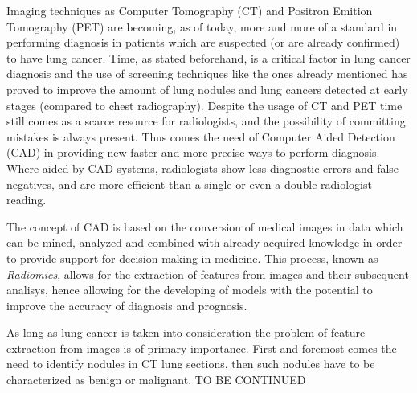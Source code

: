 \documentclass[../main.tex]{subfiles}
\begin{document}
\label{stateofart}
\thispagestyle{empty}

Imaging techniques as Computer Tomography (CT) and Positron Emition Tomography (PET) are becoming, as of today, more and more of a standard in performing diagnosis in patients which are suspected (or are already confirmed) to have lung cancer. \cite{Indicators2017} Time, as stated beforehand, is a critical factor in lung cancer diagnosis and the use of screening techniques like the ones already mentioned has proved to improve the amount of lung nodules and lung cancers detected at early stages (compared to chest radiography).\cite{AlMohammad2017} Despite the usage of CT and PET time still comes as a scarce resource for radiologists, and the possibility of committing mistakes is always present. Thus comes the need of Computer Aided Detection (CAD) in providing new faster and more precise ways to perform diagnosis. Where aided by CAD systems, radiologists show less diagnostic errors and false negatives, and are more efficient than a single or even a double radiologist reading. \cite{AlMohammad2017} 

The concept of CAD is based on the conversion of medical images in data which can be mined, analyzed and combined with already acquired knowledge in order to provide support for decision making in medicine. This process, known as \textit{Radiomics}, allows for the extraction of features from images and their subsequent analisys, hence allowing for the developing of models with the potential to improve the accuracy of diagnosis and prognosis. \cite{Gillies2016}

As long as lung cancer is taken into consideration the problem of feature extraction from images is of primary importance. First and foremost comes the need to identify nodules in CT lung sections, then such nodules have to be characterized as benign or malignant. \cite{Hussein2017} TO BE CONTINUED
\end{document}
